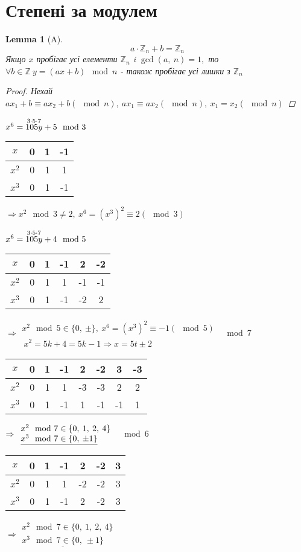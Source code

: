 \documentclass[a4paper,12pt]{bookest}
\newtheorem{lemma}[theorem]{Lemma}
\begin{document}
\section{Степені за модулем}
\begin{lemma}[A]
$$a\cdot\mathbb{Z}_n+b=\mathbb{Z}_n$$
Якщо $x$ пробігає усі елементи $\mathbb{Z}_n$ i $\gcd(a,\>n)=1,$ то $\forall b\in\mathbb{Z}\>y=(ax+b)\mod n$ - також пробігає усі лишки з $\mathbb{Z}_n$ 
\begin{proof}
	$ $Нехай $ax_1+b\equiv ax_2+b(\mod n),\>ax_1\equiv ax_2(\mod n),\>x_1=x_2(\mod n)$
\end{proof}
\end{lemma}
\begin{example}
	$x^6=\overset{3\cdot 5\cdot 7}{105y}+5\\\mod 3$
	\\
		\begin{tabular}{c|c|c|c|}
			$x$ & 0 & 1 & -1\\\hline
			$x^2$ & 0 & 1 & 1\\\hline
			$x^3$ & 0 & 1 & -1
		\end{tabular} 
	$\Rightarrow x^2\mod 3\ne 2,\>x^6=(x^3)^2\equiv 2(\mod 3)$
\end{example}\newpage 
\begin{example}
	$x^6=\overset{3\cdot 5\cdot 7}{105y}+4\\\mod 5$
	\\
		\begin{tabular}{c|c|c|c|c|c|}
			$x$ & 0 & 1 & -1 & 2 & -2\\\hline
			$x^2$ & 0 & 1 & 1 & -1 & -1\\\hline
			$x^3$ & 0 & 1 & -1 & -2 & 2
		\end{tabular}  
	$\Rightarrow $$\begin{array}{l}		
 x^2\mod 5\in\{0,\>\pm\},\>x^6=(x^3)^2\equiv -1(\mod 5)\\\>x^2=5k+4=5k-1\Rightarrow x=5t\pm 2\end{array}$
 $\mod 7$
 \\
		\begin{tabular}{c|c|c|c|c|c|c|c|}
			$x$ & 0 & 1 & -1 & 2 & -2 & 3 & -3\\\hline
			$x^2$ & 0 & 1 & 1 & -3 & -3 & 2 & 2\\\hline
			$x^3$ & 0 & 1 & -1 & 1 & -1 & -1 & 1 
		\end{tabular} $\Rightarrow\begin{array}{l}
			x^2\mod 7 \in\{0,\>1,\>2,\>4\} \\ \underline{x^3\mod 7\in\{0,\>\pm1\}}
		\end{array}\\$
 $\mod 6$
 \\
		\begin{tabular}{c|c|c|c|c|c|c|}
			$x$ & 0 & 1 & -1 & 2 & -2 & 3\\\hline
			$x^2$ & 0 & 1 & 1 & -2 & -2 & 3\\\hline
			$x^3$ & 0 & 1 & -1 & 2 & -2 & 3
		\end{tabular} $\Rightarrow\begin{array}{l}
			x^2\mod 7 \in\{0,\>1,\>2,\>4\} \\ \underline{x^3\mod 7\in\{0,\>\pm1\}}
		\end{array}$
\end{example}
\end{document}
